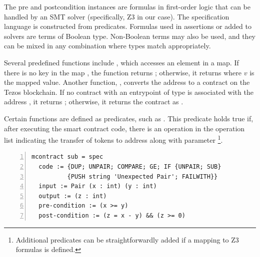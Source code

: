 \documentclass[runningheads]{llncs}
\begin{document}
The pre and postcondition instances are formulas in first-order logic that can be handled by an SMT solver (specifically, Z3 in our case). The specification language is constructed from predicates. Formulas used in assertions or added to solvers are terms of Boolean type. Non-Boolean terms may also be used, and they can be mixed in any combination where types match appropriately.

Several predefined functions include , which accesses an element in a map. If there is no key  in the map , the function returns ; otherwise, it returns  where $v$ is the mapped value. Another function, , converts the address  to a contract on the Tezos blockchain. If no contract with an entrypoint of type  is associated with the address , it returns ; otherwise, it returns the contract as .

Certain functions are defined as predicates, such as . This predicate holds true if, after executing the smart contract code, there is an operation in the operation list indicating the transfer of  tokens to address  along with parameter \footnote{Additional predicates can be straightforwardly added if a mapping to Z3 formulas is defined.}.
\begin{lstlisting}[float,captionpos=b,caption={Specification of  the \lstinline/sub/ contract},label={lst:sub-contract-specification},numbers=left]
mcontract sub = spec
  code := {DUP; UNPAIR; COMPARE; GE; IF {UNPAIR; SUB} 
          {PUSH string 'Unexpected Pair'; FAILWITH}}
  input := Pair (x : int) (y : int)
  output := (z : int)
  pre-condition := (x >= y)
  post-condition := (z = x - y) && (z >= 0)
\end{lstlisting}
\end{document}
